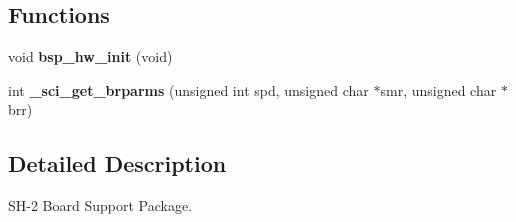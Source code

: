 \subsection*{Functions}
\begin{DoxyCompactItemize}
\item 
\mbox{\label{group__RTEMSBSPsSH2_gad645179cbf4b50dedeb57bc691cb548f}} 
void {\bfseries bsp\+\_\+hw\+\_\+init} (void)
\item 
\mbox{\label{group__RTEMSBSPsSH2_ga77a90b9ec1a77714a18ec6bab9188c6c}} 
int {\bfseries \+\_\+sci\+\_\+get\+\_\+brparms} (unsigned int spd, unsigned char $\ast$smr, unsigned char $\ast$brr)
\end{DoxyCompactItemize}


\subsection{Detailed Description}
S\+H-\/2 Board Support Package. 

